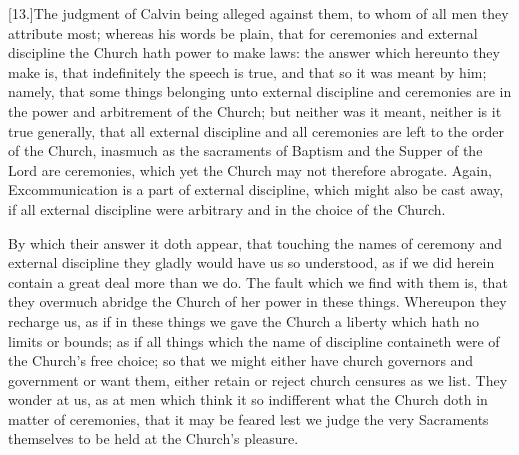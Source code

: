 [13.]The judgment of Calvin being alleged against them,  to whom of all men they attribute most; whereas his words be plain, that for ceremonies and external discipline the Church hath power to make laws: the answer which hereunto they make is, that indefinitely the speech is true, and that so it was meant by him; namely, that some things belonging unto external discipline and ceremonies are in the power and arbitrement of the Church; but neither was it meant, neither is it true generally, that all external discipline and all ceremonies are left to the order of the Church, inasmuch as the sacraments of Baptism and the Supper of the Lord are ceremonies, which yet the Church may not therefore abrogate. Again, Excommunication is a part of external discipline, which might also be cast away, if all external discipline were arbitrary and in the choice of the Church.

By which their answer it doth appear, that touching the names of ceremony and external discipline they gladly would have us so understood, as if we did herein contain a great deal more than we do. The fault which we find with them is, that they overmuch abridge the Church of her power in these things. Whereupon they recharge us, as if in these things we gave the Church a liberty which hath no limits or bounds; as if all things which the name of discipline containeth were of the Church’s free choice; so that we might either have church governors and government or want them, either retain or reject church censures as we list. They wonder at us, as at men which think it so indifferent what the Church doth in matter of ceremonies, that it may be feared lest we judge the very Sacraments themselves to be held at the Church’s pleasure.


